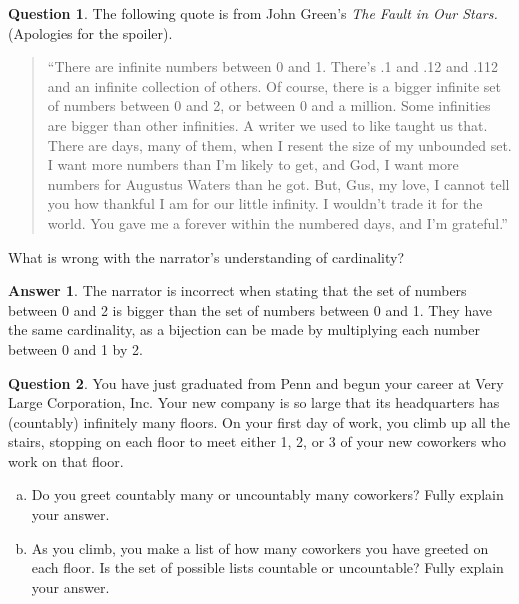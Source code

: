 \documentclass[article, 12pt]{article}
\theoremstyle{definition}
\newtheorem{question}{Question}
\newtheorem{answer}{Answer}
\begin{document}
    \begin{question}
        The following quote is from John Green's \textit{The Fault in Our Stars.} (Apologies for the spoiler).
        \begin{quotation}
            \noindent``There are infinite numbers between 0 and 1. There's .1 and .12 and .112 and an infinite collection of others. Of course, there is a bigger infinite set of numbers between 0 and 2, or between 0 and a million. Some infinities are bigger than other infinities. A writer we used to like taught us that. There are days, many of them, when I resent the size of my unbounded set. I want more numbers than I'm likely to get, and God, I want more numbers for Augustus Waters than he got. But, Gus, my love, I cannot tell you how thankful I am for our little infinity. I wouldn't trade it for the world. You gave me a forever within the numbered days, and I'm grateful.''
        \end{quotation}
        What is wrong with the narrator's understanding of cardinality?
    \end{question}

    \begin{answer}
        The narrator is incorrect when stating that the set of numbers between 0 and 2 is bigger than the set of numbers between 0 and 1. They have the same cardinality, as a bijection can be made by multiplying each number between 0 and 1 by 2. 
    \end{answer}

    \begin{question}
        You have just graduated from Penn and begun your career at Very Large Corporation, Inc.
        Your new company is so large that its headquarters has (countably) infinitely many floors.
        On your first day of work, you climb up all the stairs, stopping on each floor to meet either 1, 2, or 3 of your new coworkers who work on that floor.

        \begin{enumerate}[a)]
            \item Do you greet countably many or uncountably many coworkers? Fully explain your
            answer.
            \item As you climb, you make a list of how many coworkers you have greeted on each floor. Is the set of possible lists countable or uncountable? Fully explain your answer.
        \end{enumerate}
    \end{question}
\end{document}
